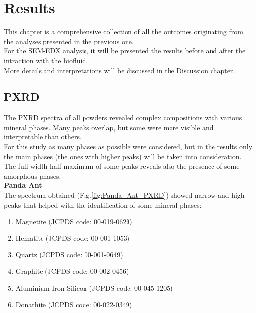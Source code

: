 \chapter{Results}

This chapter is a comprehensive collection of all the outcomes originating from the analyses presented in the previous one.\\
For the SEM-EDX analysis, it will be presented the results before and after the intraction with the biofluid.\\
More details and interpretations will be discussed in the Discussion chapter.

\section{PXRD}

The PXRD spectra of all powders revealed complex compositions with various mineral phases. Many peaks overlap, but some were more visible and interpretable than others. \\
For this study as many phases as possible were considered, but in the results only the main phases (the ones with higher peaks) will be taken into consideration. \\
The full width half maximum of some peaks reveals also the presence of some amorphous phases. \\

\textbf{Panda Ant} \\
The spectrum obtained (Fig.\ref{fig:Panda_Ant_PXRD}) showed narrow and high peaks that helped with the identification of some mineral phases:

\begin{enumerate}[noitemsep]
    \item Magnetite (JCPDS code: 00-019-0629)
    \item Hematite (JCPDS code: 00-001-1053)
    \item Quartz (JCPDS code: 00-001-0649)
    \item Graphite (JCPDS code: 00-002-0456)
    \item Aluminium Iron Silicon (JCPDS code: 00-045-1205)
    \item Donathite (JCPDS code: 00-022-0349)
\end{enumerate}

